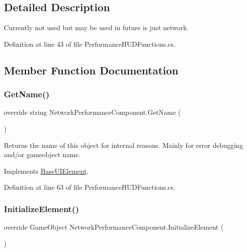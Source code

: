 \subsection{Detailed Description}
Currently not used but may be used in future is just network. 



Definition at line 43 of file Performance\+H\+U\+D\+Functions.\+cs.



\subsection{Member Function Documentation}
\mbox{\label{class_network_performance_component_a85df95c2eb70be4313719be4793ad409}} 
\subsubsection{\texorpdfstring{Get\+Name()}{GetName()}}
{\footnotesize\ttfamily override string Network\+Performance\+Component.\+Get\+Name (\begin{DoxyParamCaption}{ }\end{DoxyParamCaption})\hspace{0.3cm}{\ttfamily [virtual]}}



Returns the name of this object for internal reasons. Mainly for error debugging and/or gameobject name. 



Implements \hyperlink{class_base_u_i_element_acb7fcd49138477941f2e43733ad9d34d}{Base\+U\+I\+Element}.



Definition at line 63 of file Performance\+H\+U\+D\+Functions.\+cs.

\mbox{\label{class_network_performance_component_ae8aa1763b5e0e67ee68f8433fa5c3dec}} 
\subsubsection{\texorpdfstring{Initialize\+Element()}{InitializeElement()}}
{\footnotesize\ttfamily override Game\+Object Network\+Performance\+Component.\+Initialize\+Element (\begin{DoxyParamCaption}{ }\end{DoxyParamCaption})\hspace{0.3cm}{\ttfamily [virtual]}}




